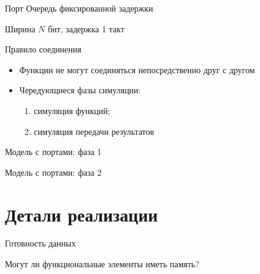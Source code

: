 \documentclass{beamer}
\begin{document}
\begin{frame}{Порт}
Очередь фиксированной задержки

Ширина $N$ бит, задержка 1 такт

\vfill
\centering


\end{frame}

\begin{frame}{Правило соединения}

\begin{itemize}
\item Функции не могут соединяться непосредственно друг с другом
\item Чередующиеся фазы симуляции:
\begin{enumerate}
    \item симуляция функций;
    \item симуляция передачи результатов
\end{enumerate}
\end{itemize}
\end{frame}

\begin{frame}{Модель с портами: фаза 1}

\centering


\end{frame}

\begin{frame}{Модель с портами: фаза 2}

\centering


\end{frame}


\section{Детали реализации}

\begin{frame}{Готовность данных}

\centering


\end{frame}

\begin{frame}{Могут ли функциональные элементы иметь память?}

\centering


\end{frame}
\end{document}
